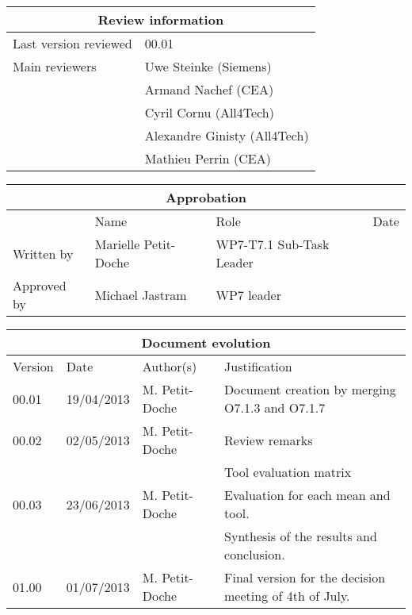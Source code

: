 \documentclass{template/openetcs_report}
\begin{document}
\begin{tabular}{|p{4.4cm}|p{8.7cm}|}
\hline
\multicolumn{2}{|c|}{Review information} \\
\hline
Last version reviewed & 00.01 \\
\hline
Main reviewers & Uwe Steinke (Siemens) \\
 & Armand Nachef (CEA) \\
 & Cyril Cornu (All4Tech) \\
 & Alexandre Ginisty (All4Tech) \\
 & Mathieu Perrin (CEA) \\
\hline
\end{tabular}

\begin{tabular}{|p{2.2cm}|p{4cm}|p{4cm}|p{2cm}|}
\hline
\multicolumn{4}{|c|}{Approbation} \\
\hline
  &  Name & Role & Date   \\
\hline  
Written by    &  Marielle Petit-Doche & WP7-T7.1 Sub-Task Leader  & \\
\hline
Approved by & Michael Jastram & WP7 leader & \\
\hline
\end{tabular}

\begin{tabular}{|p{2.2cm}|p{2cm}|p{3cm}|p{5cm}|}
\hline
\multicolumn{4}{|c|}{Document evolution} \\
\hline
Version &  Date & Author(s) & Justification  \\
\hline  
00.01 & 19/04/2013 & M. Petit-Doche &  Document creation by merging O7.1.3 and O7.1.7 \\
\hline  
00.02 & 02/05/2013 & M. Petit-Doche &  Review remarks \\
& & & Tool evaluation matrix \\
\hline  
00.03 & 23/06/2013 & M. Petit-Doche &  Evaluation for each mean and tool. \\
& & & Synthesis of the results and conclusion. \\
\hline  
01.00 & 01/07/2013 & M. Petit-Doche &  Final version for the decision meeting of 4th of July. \\
\hline  
\end{tabular}



\newcommand{\tbd}{\colorbox{cyan}{\%\%To Be Defined\%\%}}
\newcommand{\tbc}{\colorbox{cyan}{\%\%To Be Confirmed\%\%}}
\newcommand{\todo}[1]{\colorbox{cyan}{\%\%{#1}\%\%}}
\newlength{\origindent}
\end{document}
